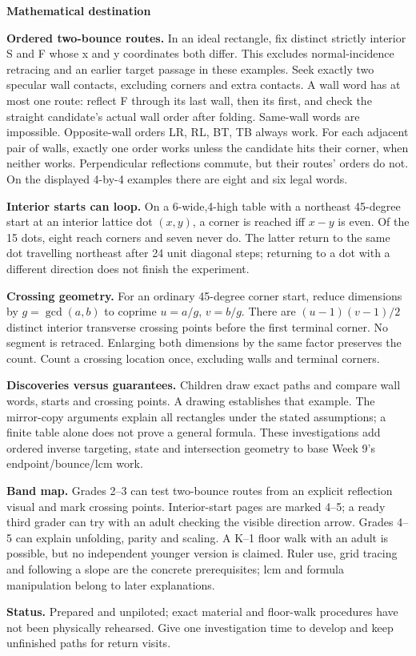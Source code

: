 \documentclass[11pt]{article}
\newcommand{\parttitle}[1]{{\large\bfseries\color{ink}#1}\par}
\newcommand{\labelled}[2]{\textbf{#1} #2\par}
\begin{document}
\parttitle{Mathematical destination}
\labelled{Ordered two-bounce routes.}{In an ideal rectangle, fix distinct strictly interior S and F whose x and y coordinates both differ. This excludes normal-incidence retracing and an earlier target passage in these examples. Seek exactly two specular wall contacts, excluding corners and extra contacts. A wall word has at most one route: reflect F through its last wall, then its first, and check the straight candidate's actual wall order after folding. Same-wall words are impossible. Opposite-wall orders LR, RL, BT, TB always work. For each adjacent pair of walls, exactly one order works unless the candidate hits their corner, when neither works. Perpendicular reflections commute, but their routes' orders do not. On the displayed 4-by-4 examples there are eight and six legal words.}
\labelled{Interior starts can loop.}{On a 6-wide,4-high table with a northeast 45-degree start at an interior lattice dot $(x,y)$, a corner is reached iff $x-y$ is even. Of the 15 dots, eight reach corners and seven never do. The latter return to the same dot travelling northeast after 24 unit diagonal steps; returning to a dot with a different direction does not finish the experiment.}
\labelled{Crossing geometry.}{For an ordinary 45-degree corner start, reduce dimensions by $g=\gcd(a,b)$ to coprime $u=a/g$, $v=b/g$. There are $(u-1)(v-1)/2$ distinct interior transverse crossing points before the first terminal corner. No segment is retraced. Enlarging both dimensions by the same factor preserves the count. Count a crossing location once, excluding walls and terminal corners.}
\labelled{Discoveries versus guarantees.}{Children draw exact paths and compare wall words, starts and crossing points. A drawing establishes that example. The mirror-copy arguments explain all rectangles under the stated assumptions; a finite table alone does not prove a general formula. These investigations add ordered inverse targeting, state and intersection geometry to base Week 9's endpoint/bounce/lcm work.}
\labelled{Band map.}{Grades 2--3 can test two-bounce routes from an explicit reflection visual and mark crossing points. Interior-start pages are marked 4--5; a ready third grader can try with an adult checking the visible direction arrow. Grades 4--5 can explain unfolding, parity and scaling. A K--1 floor walk with an adult is possible, but no independent younger version is claimed. Ruler use, grid tracing and following a slope are the concrete prerequisites; lcm and formula manipulation belong to later explanations.}
\labelled{Status.}{Prepared and unpiloted; exact material and floor-walk procedures have not been physically rehearsed. Give one investigation time to develop and keep unfinished paths for return visits.}
\end{document}
